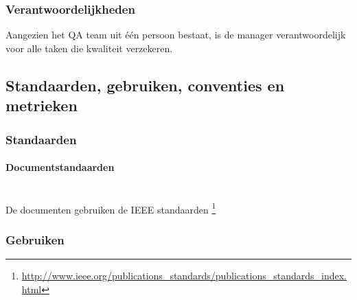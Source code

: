 \subsubsection{Verantwoordelijkheden}

Aangezien het QA team uit één persoon bestaat, is de manager verantwoordelijk voor alle taken die kwaliteit verzekeren.

\begin{comment}
\subsection{Documentatie}

Niet van toepassing

\end{comment}

\subsection{Standaarden, gebruiken, conventies en metrieken}

\subsubsection {Standaarden}

\paragraph {Documentstandaarden} ~\\
De documenten gebruiken de IEEE standaarden  \footnote{\url{http://www.ieee.org/publications_standards/publications_standards_index.html}}
\begin{comment}

\paragraph{Codering standaarden}

In ontwikkeling.

\paragraph{Commentaar standaarden}

In ontwikkeling.

\end{comment}

\subsubsection{Gebruiken}

